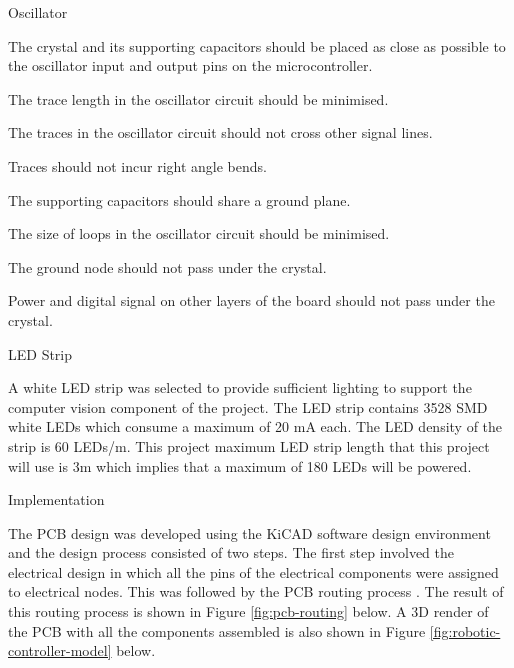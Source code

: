 
Oscillator


\begin{compactitem}
	\item The crystal and its supporting capacitors should be placed as close as possible to the oscillator input and output pins on the microcontroller.
	\item The trace length in the oscillator circuit should be minimised.
	\item The traces in the oscillator circuit should not cross other signal lines.
	\item Traces should not incur right angle bends.
	\item The supporting capacitors should share a ground plane.
	\item The size of loops in the oscillator circuit should be minimised.
	\item The ground node should not pass under the crystal.
	\item Power and digital signal on other layers of the board should not pass under the crystal. 
\end{compactitem}

LED Strip

A white LED strip was selected to provide sufficient lighting to support the computer vision component of the project. The LED strip contains 3528 SMD white LEDs which consume a maximum of 20 mA each. The LED density of the strip is 60 LEDs/m. This project maximum LED strip length that this project will use is 3m which implies that a maximum of 180 LEDs will be powered.

Implementation

The PCB design was developed using the KiCAD software design environment and the design process consisted of two steps. The first step involved the electrical design in which all the pins of the electrical components were assigned to electrical nodes. This was followed by the PCB routing process . The result of this routing process is shown in Figure \ref{fig:pcb-routing} below. A 3D render of the PCB with all the components assembled is also shown in Figure \ref{fig:robotic-controller-model} below.

